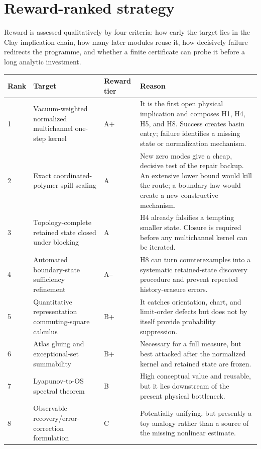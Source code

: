 \section{Reward-ranked strategy}

Reward is assessed qualitatively by four criteria: how early the target lies
in the Clay implication chain, how many later modules reuse it, how decisively
failure redirects the programme, and whether a finite certificate can probe
it before a long analytic investment.

\begin{longtable}{p{}p{}p{}p{}}
\toprule
Rank & Target & Reward tier & Reason\\
\midrule
\endhead
1 & Vacuum-weighted normalized multichannel one-step kernel & A+ & It is the
first open physical implication and composes H1, H4, H5, and H8.  Success
creates basin entry; failure identifies a missing state or normalization
mechanism.\\
2 & Exact coordinated-polymer spill scaling & A & New zero modes give a cheap,
decisive test of the repair backup.  An extensive lower bound would kill the
route; a boundary law would create a new constructive mechanism.\\
3 & Topology-complete retained state closed under blocking & A & H4 already
falsifies a tempting smaller state.  Closure is required before any
multichannel kernel can be iterated.\\
4 & Automated boundary-state sufficiency refinement & A-- & H8 can turn
counterexamples into a systematic retained-state discovery procedure and
prevent repeated history-erasure errors.\\
5 & Quantitative representation commuting-square calculus & B+ & It catches
orientation, chart, and limit-order defects but does not by itself provide
probability suppression.\\
6 & Atlas gluing and exceptional-set summability & B+ & Necessary for a full
measure, but best attacked after the normalized kernel and retained state are
frozen.\\
7 & Lyapunov-to-OS spectral theorem & B & High conceptual value and reusable,
but it lies downstream of the present physical bottleneck.\\
8 & Observable recovery/error-correction formulation & C & Potentially
unifying, but presently a toy analogy rather than a source of the missing
nonlinear estimate.\\
\bottomrule
\end{longtable}

